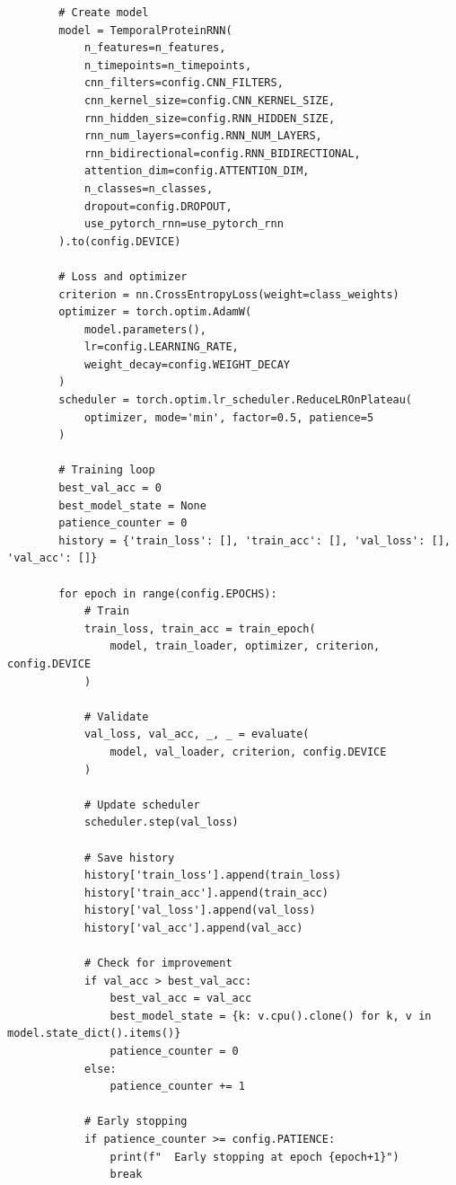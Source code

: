 \begin{lstlisting}
        # Create model
        model = TemporalProteinRNN(
            n_features=n_features,
            n_timepoints=n_timepoints,
            cnn_filters=config.CNN_FILTERS,
            cnn_kernel_size=config.CNN_KERNEL_SIZE,
            rnn_hidden_size=config.RNN_HIDDEN_SIZE,
            rnn_num_layers=config.RNN_NUM_LAYERS,
            rnn_bidirectional=config.RNN_BIDIRECTIONAL,
            attention_dim=config.ATTENTION_DIM,
            n_classes=n_classes,
            dropout=config.DROPOUT,
            use_pytorch_rnn=use_pytorch_rnn
        ).to(config.DEVICE)
 
        # Loss and optimizer
        criterion = nn.CrossEntropyLoss(weight=class_weights)
        optimizer = torch.optim.AdamW(
            model.parameters(),
            lr=config.LEARNING_RATE,
            weight_decay=config.WEIGHT_DECAY
        )
        scheduler = torch.optim.lr_scheduler.ReduceLROnPlateau(
            optimizer, mode='min', factor=0.5, patience=5
        )
 
        # Training loop
        best_val_acc = 0
        best_model_state = None
        patience_counter = 0
        history = {'train_loss': [], 'train_acc': [], 'val_loss': [], 'val_acc': []}
 
        for epoch in range(config.EPOCHS):
            # Train
            train_loss, train_acc = train_epoch(
                model, train_loader, optimizer, criterion, config.DEVICE
            )
 
            # Validate
            val_loss, val_acc, _, _ = evaluate(
                model, val_loader, criterion, config.DEVICE
            )
 
            # Update scheduler
            scheduler.step(val_loss)
 
            # Save history
            history['train_loss'].append(train_loss)
            history['train_acc'].append(train_acc)
            history['val_loss'].append(val_loss)
            history['val_acc'].append(val_acc)
 
            # Check for improvement
            if val_acc > best_val_acc:
                best_val_acc = val_acc
                best_model_state = {k: v.cpu().clone() for k, v in model.state_dict().items()}
                patience_counter = 0
            else:
                patience_counter += 1
 
            # Early stopping
            if patience_counter >= config.PATIENCE:
                print(f"  Early stopping at epoch {epoch+1}")
                break
 

\end{lstlisting}

